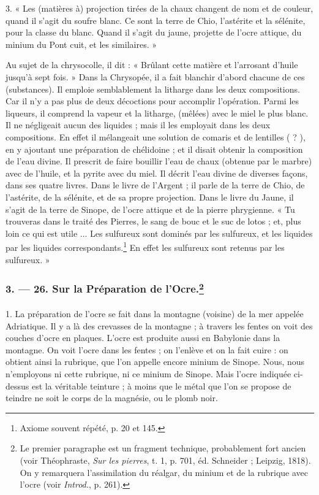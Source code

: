 \documentclass[a4paper, 11pt, oneside, polutonikogreek, french]{article}
\begin{document}
3. « Les (matières à) projection tirées de la chaux changent de nom et de couleur, quand il s'agit du soufre blanc. Ce sont la terre de Chio, l'astérite et la sélénite, pour la classe du blanc. Quand il s'agit du jaune, projette de l'ocre attique, du minium du Pont cuit, et les similaires. »

Au sujet de la chrysocolle, il dit : « Brûlant cette matière et l'arrosant d'huile jusqu'à sept fois. » Dans la Chrysopée, il a fait blanchir d'abord chacune de ces (substances). Il emploie semblablement la litharge dans les deux compositions. Car il n'y a pas plus de deux décoctions pour accomplir l'opération. Parmi les liqueurs, il comprend la vapeur et la litharge, (mêlées) avec le miel le plus blanc. Il ne négligeait aucun des liquides ; mais il les employait dans les deux compositions. En effet il mélangeait une solution de comaris et de lentilles ( ? ), en y ajoutant une préparation de chélidoine ; et il disait obtenir la composition de l'eau divine. Il prescrit de faire bouillir l'eau de chaux (obtenue par le marbre) avec de l'huile, et la pyrite avec du miel. Il décrit l'eau divine de diverses façons, dans ses quatre livres. Dans le livre de l'Argent ; il parle de la terre de Chio, de l'astérite, de la sélénite, et de sa propre projection. Dans le livre du Jaune, il s'agit de la terre de Sinope, de l'ocre attique et de la pierre phrygienne. « Tu trouveras dans le traité des Pierres, le sang de bouc et le suc de lotos ; et, plus loin ce qui est utile ... Les sulfureux sont dominés par les sulfureux, et les liquides par les liquides correspondants.\footnote{Axiome souvent répété, p. 20 et 145.} En effet les sulfureux sont retenus par les sulfureux. »

\bigskip
\centerline{\EightStarTaper}
\centerline{\EightStarTaper\EightStarTaper}
\bigskip

\subsubsection[3. --- 26. Sur la Préparation de l'Ocre.]{3. --- 26. Sur la Préparation de l'Ocre.\footnote{Le premier paragraphe est un fragment technique, probablement fort ancien (voir Théophraste, \emph{Sur les pierres}, t. 1, p. 701, éd. Schneider ; Leipzig, 1818). On y remarquera l'assimilation du réalgar, du minium et de la rubrique avec l'ocre (voir \emph{Introd.}, p. 261).}}
\paragraph{}
1. La préparation de l'ocre se fait dans la montagne (voisine) de la mer appelée Adriatique. Il y a là des crevasses de la montagne ; à travers les fentes on voit des couches d'ocre en plaques. L'ocre est produite aussi en Babylonie dans la montagne. On voit l'ocre dans les fentes ; on l'enlève et on la fait cuire : on obtient ainsi la rubrique, que l'on appelle encore minium de Sinope. Nous, nous n'employons ni cette rubrique, ni ce minium de Sinope. Mais l'ocre indiquée ci-dessus est la véritable teinture ; à moins que le métal que l'on se propose de teindre ne soit le corps de la magnésie, ou le plomb noir.
\end{document}
